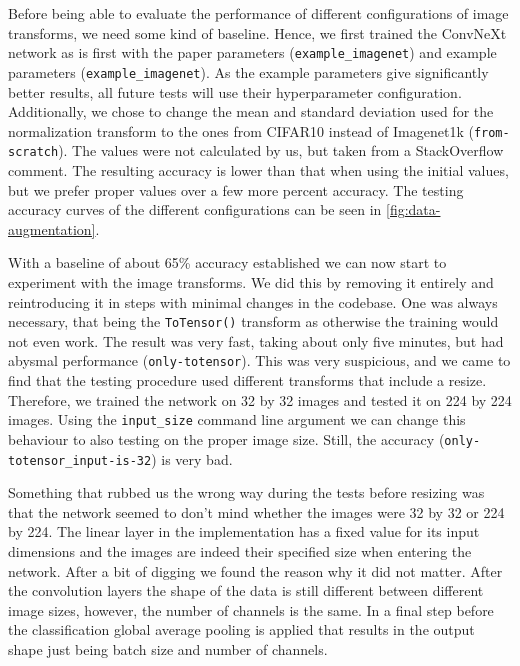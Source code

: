 \documentclass{article}
\begin{document}
Before being able to evaluate the performance of different configurations of image transforms, we need some kind of baseline.
Hence, we first trained the ConvNeXt network as is first with the paper parameters (\texttt{example\_imagenet}) and example parameters (\texttt{example\_imagenet}).
As the example parameters give significantly better results, all future tests will use their hyperparameter configuration.
Additionally, we chose to change the mean and standard deviation used for the normalization transform to the ones from CIFAR10 instead of Imagenet1k (\texttt{from-scratch}).
The values were not calculated by us, but taken from a StackOverflow\cite{stackoverflow} comment.
The resulting accuracy is lower than that when using the initial values, but we prefer proper values over a few more percent accuracy.
The testing accuracy curves of the different configurations can be seen in \autoref{fig:data-augmentation}.

With a baseline of about 65\% accuracy established we can now start to experiment with the image transforms.
We did this by removing it entirely and reintroducing it in steps with minimal changes in the codebase.
One was always necessary, that being the \texttt{ToTensor()} transform as otherwise the training would not even work.
The result was very fast, taking about only five minutes, but had abysmal performance (\texttt{only-totensor}).
This was very suspicious, and we came to find that the testing procedure used different transforms that include a resize.
Therefore, we trained the network on 32 by 32 images and tested it on 224 by 224 images.
Using the \texttt{input\_size} command line argument we can change this behaviour to also testing on the proper image size.
Still, the accuracy (\texttt{only-totensor\_input-is-32}) is very bad.

Something that rubbed us the wrong way during the tests before resizing was that the network seemed to don't mind whether the images were 32 by 32 or 224 by 224.
The linear layer in the implementation has a fixed value for its input dimensions and the images are indeed their specified size when entering the network.
After a bit of digging we found the reason why it did not matter.
After the convolution layers the shape of the data is still different between different image sizes, however, the number of channels is the same.
In a final step before the classification global average pooling is applied that results in the output shape just being batch size and number of channels.
\end{document}
